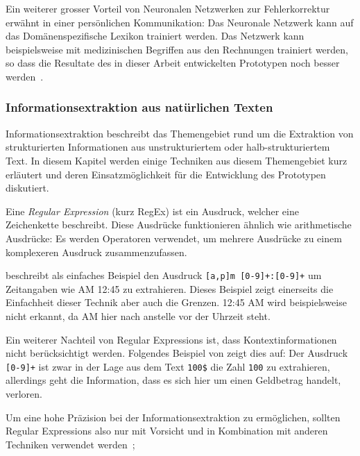 Ein weiterer grosser Vorteil von Neuronalen Netzwerken zur Fehlerkorrektur erwähnt \textcite{Mugan2018} in einer persönlichen Kommunikation: Das Neuronale Netzwerk kann auf das Domänenspezifische Lexikon trainiert werden. Das Netzwerk kann beispielsweise mit medizinischen Begriffen aus den Rechnungen trainiert werden, so dass die Resultate des in dieser Arbeit entwickelten Prototypen noch besser werden~\autocite{Mugan2018}.

\subsubsection{Informationsextraktion aus natürlichen Texten}


Informationsextraktion beschreibt das Themengebiet rund um die Extraktion von strukturierten Informationen aus unstrukturiertem oder halb-strukturiertem Text. In diesem Kapitel werden einige Techniken aus diesem Themengebiet kurz erläutert und deren Ein\-satz\-mög\-lich\-keit für die Entwicklung des Prototypen diskutiert.

Eine \textit{Regular Expression} (kurz RegEx) ist ein Ausdruck, welcher eine Zeichenkette beschreibt. Diese Ausdrücke funktionieren ähnlich wie arithmetische Ausdrücke: Es werden Operatoren verwendet, um mehrere Ausdrücke zu einem komplexeren Ausdruck zusammenzufassen\autocite{Xiao2004}.

\textcite{Xiao2004} beschreibt als einfaches Beispiel den Ausdruck \texttt{[a,p]m [0-9]+:[0-9]+} um Zeitangaben wie AM 12:45 zu extrahieren. Dieses Beispiel zeigt einerseits die Einfachheit dieser Technik aber auch die Grenzen. 12:45 AM wird beispielsweise nicht erkannt, da AM hier nach anstelle vor der Uhrzeit steht. 

Ein weiterer Nachteil von Regular Expressions ist, dass Kontextinformationen nicht be\-rück\-sich\-tigt werden. Folgendes Beispiel von \textcite{Xiao2004} zeigt dies auf: Der Ausdruck \texttt{[0-9]+} ist zwar in der Lage aus dem Text \texttt{100\$} die Zahl \texttt{100} zu extrahieren, allerdings geht die Information, dass es sich hier um einen Geldbetrag handelt, verloren.

Um eine hohe Präzision bei der Informationsextraktion zu ermöglichen, sollten Regular Expressions also nur mit Vorsicht und in Kombination mit anderen Techniken verwendet werden~\autocite{Xiao2004};

